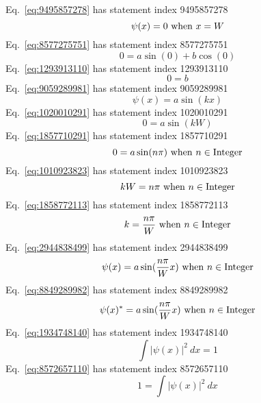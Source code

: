 \documentclass[12pt]{report}
\newcommand{\when}[1]{{\rm \ when\ }#1}
\begin{document}
Eq.~\ref{eq:9495857278} has statement index 9495857278
\begin{equation}
\psi(x)=0\when{x=W}
\label{eq:9495857278}
\end{equation}
Eq.~\ref{eq:8577275751} has statement index 8577275751
\begin{equation}
0=a \sin(0) + b\cos(0)
\label{eq:8577275751}
\end{equation}
Eq.~\ref{eq:1293913110} has statement index 1293913110
\begin{equation}
0=b
\label{eq:1293913110}
\end{equation}
Eq.~\ref{eq:9059289981} has statement index 9059289981
\begin{equation}
\psi(x)=a \sin(k x)
\label{eq:9059289981}
\end{equation}
Eq.~\ref{eq:1020010291} has statement index 1020010291
\begin{equation}
0=a \sin(k W)
\label{eq:1020010291}
\end{equation}
Eq.~\ref{eq:1857710291} has statement index 1857710291
\begin{equation}
0=a \sin(n \pi) \when{n \in {\rm Integer}}
\label{eq:1857710291}
\end{equation}
Eq.~\ref{eq:1010923823} has statement index 1010923823
\begin{equation}
k W = n \pi \when{n \in {\rm Integer}}
\label{eq:1010923823}
\end{equation}
Eq.~\ref{eq:1858772113} has statement index 1858772113
\begin{equation}
k = \frac{n \pi}{W} \when{n \in {\rm Integer}}
\label{eq:1858772113}
\end{equation}
Eq.~\ref{eq:2944838499} has statement index 2944838499
\begin{equation}
\psi(x)=a \sin(\frac{n \pi}{W} x) \when{n \in {\rm Integer}}
\label{eq:2944838499}
\end{equation}
Eq.~\ref{eq:8849289982} has statement index 8849289982
\begin{equation}
\psi(x)^*=a \sin(\frac{n \pi}{W} x) \when{n \in {\rm Integer}}
\label{eq:8849289982}
\end{equation}
Eq.~\ref{eq:1934748140} has statement index 1934748140
\begin{equation}
\int |\psi(x)|^2\ dx = 1
\label{eq:1934748140}
\end{equation}
Eq.~\ref{eq:8572657110} has statement index 8572657110
\begin{equation}
1= \int |\psi(x)|^2\ dx
\label{eq:8572657110}
\end{equation}
\end{document}
